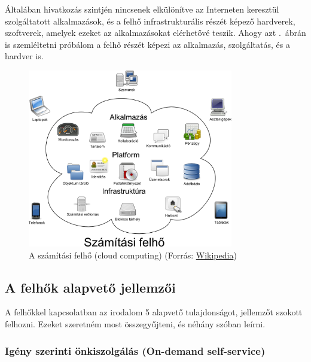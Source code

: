 Általában hivatkozás szintjén nincsenek elkülönítve az Interneten keresztül szolgáltatott alkalmazások, és a felhő infrastrukturális részét képező hardverek, szoftverek, amelyek ezeket az alkalmazásokat elérhetővé teszik. Ahogy azt .~ábrán is szemléltetni próbálom a felhő részét képezi az alkalmazás, szolgáltatás, és a hardver is.

\begin{figure}[h!]
\centering
\includegraphics[width=0.80\textwidth]{figures/Cloud_computing_hu.png}
\caption{A számítási felhő (\foreignlanguage{english}{cloud computing}) (Forrás: \href{https://en.wikipedia.org/wiki/File:Cloud\_computing.svg}{Wikipedia})} \label{fig:cloud_computing_hu}
\end{figure}

\subsection{A felhők alapvető jellemzői}
A felhőkkel kapcsolatban az irodalom\cite{nistsp800-145} 5 alapvető tulajdonságot, jellemzőt szokott felhozni. Ezeket szeretném most összegyűjteni, és néhány szóban leírni.
 
\subsubsection{Igény szerinti önkiszolgálás (\foreignlanguage{english}{On-demand self-service})}


